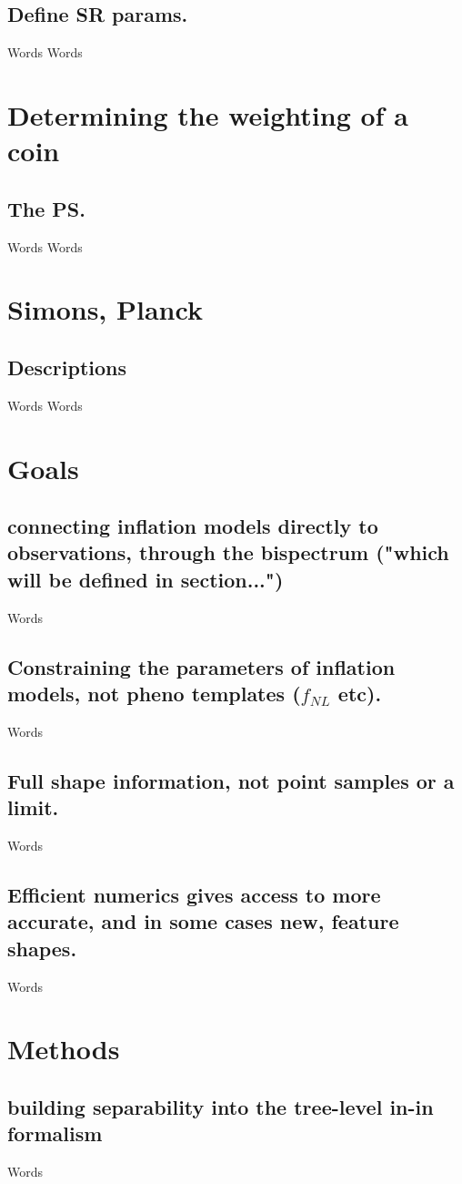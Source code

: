     \subsection{Define SR params.}
    Words
\newpage
    Words
\newpage
\section{Determining the weighting of a coin}
    \subsection{The PS.}
    Words
\newpage
    Words
\newpage
\section{Simons, Planck}
    \subsection{Descriptions}
    Words
\newpage
    Words
\newpage
\section{Goals}
    \subsection{connecting inflation models directly to observations, through the bispectrum ("which will be defined in section...")}
    Words
    \subsection{Constraining the parameters of inflation models, not pheno templates ($f_{NL}$ etc).}
    Words
    \subsection{Full shape information, not point samples or a limit.}
    Words
    \subsection{Efficient numerics gives access to more accurate, and in some cases new, feature shapes.}
    Words
\newpage
\section{Methods}
    \subsection{building separability into the tree-level in-in formalism}
    Words
